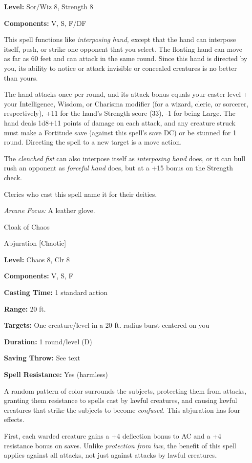 \documentclass{article}
\begin{document}
\textbf{Level:} Sor/Wiz 8, Strength 8

\textbf{Components:} V, S, F/DF

This spell functions like \textit{interposing hand, }except that the hand can interpose 
itself, push, or strike one opponent that you select. The floating hand can move 
as far as 60 feet and can attack in the same round. Since this hand is directed 
by you, its ability to notice or attack invisible or concealed creatures is no 
better than yours.

The hand attacks once per round, and its attack bonus equals your caster level 
+ your Intelligence, Wisdom, or Charisma modifier (for a wizard, cleric, or sorcerer, 
respectively), +11 for the hand's Strength score (33), -1 for being Large. The 
hand deals 1d8+11 points of damage on each attack, and any creature struck must 
make a Fortitude save (against this spell's save DC) or be stunned for 1 round. 
Directing the spell to a new target is a move action.

The \textit{clenched fist }can also interpose itself as \textit{interposing hand 
}does, or it can bull rush an opponent as \textit{forceful hand }does, but at a 
+15 bonus on the Strength check.

Clerics who cast this spell name it for their deities.

\textit{Arcane Focus: }A leather glove.

\vspace{12pt}
Cloak of Chaos

Abjuration [Chaotic]

\textbf{Level:} Chaos 8, Clr 8

\textbf{Components:} V, S, F

\textbf{Casting Time:} 1 standard action

\textbf{Range:} 20 ft.

\textbf{Targets:} One creature/level in a 20-ft.-radius burst centered on you

\textbf{Duration:} 1 round/level (D)

\textbf{Saving Throw:} See text

\textbf{Spell Resistance:} Yes (harmless)

A random pattern of color surrounds the subjects, protecting them from attacks, 
granting them resistance to spells cast by lawful creatures, and causing lawful 
creatures that strike the subjects to become \textit{confused. }This abjuration 
has four effects.

First, each warded creature gains a +4 deflection bonus to AC and a +4 resistance 
bonus on saves. Unlike \textit{protection from law}, the benefit of this spell 
applies against all attacks, not just against attacks by lawful creatures.
\end{document}
